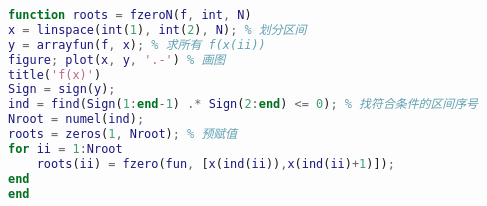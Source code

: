 \begin{lstlisting}[language=Matlab]
function roots = fzeroN(f, int, N)
x = linspace(int(1), int(2), N); % 划分区间
y = arrayfun(f, x); % 求所有 f(x(ii))
figure; plot(x, y, '.-') % 画图
title('f(x)')
Sign = sign(y);
ind = find(Sign(1:end-1) .* Sign(2:end) <= 0); % 找符合条件的区间序号
Nroot = numel(ind);
roots = zeros(1, Nroot); % 预赋值
for ii = 1:Nroot
    roots(ii) = fzero(fun, [x(ind(ii)),x(ind(ii)+1)]);  
end
end
\end{lstlisting}